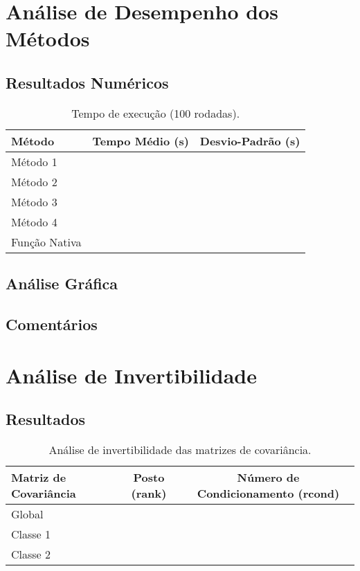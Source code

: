 \documentclass[a4paper, 12pt]{article}
\begin{document}
\section{Análise de Desempenho dos Métodos}

\subsection{Resultados Numéricos}
\begin{table}[H]
    \centering
    \caption{Tempo de execução (100 rodadas).}
    \label{tab:tempos}
    \begin{tabular}{lcc}
        \toprule
        \textbf{Método} & \textbf{Tempo Médio (s)} & \textbf{Desvio-Padrão (s)} \\
        \midrule
        Método 1        &       &         \\
        Método 2        &       &         \\
        Método 3        &       &         \\
        Método 4        &       &         \\
        Função Nativa   &       &         \\
        \bottomrule
    \end{tabular}
\end{table}

\subsection{Análise Gráfica}


\subsection{Comentários}


\section{Análise de Invertibilidade}

\subsection{Resultados}
\begin{table}[H]
    \centering
    \caption{Análise de invertibilidade das matrizes de covariância.}
    \label{tab:invert}
    \begin{tabular}{lcc}
        \toprule
        \textbf{Matriz de Covariância} & \textbf{Posto (rank)} & \textbf{Número de Condicionamento (rcond)} \\
        \midrule
        Global                         &      &      \\
        Classe 1                       &      &      \\
        Classe 2                       &      &      \\
        \bottomrule
    \end{tabular}
\end{table}
\end{document}

